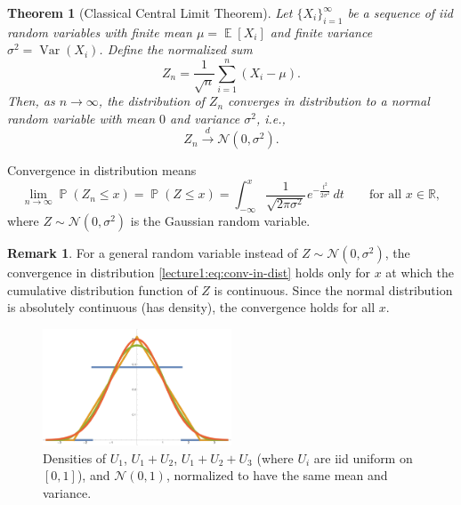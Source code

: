 \documentclass[letterpaper,11pt,oneside,reqno]{book}
\numberwithin{equation}{chapter}  %
\newcommand{\ssp}{\hspace{1pt}}
\newtheorem{theorem}[proposition]{Theorem}
\theoremstyle{definition}
\newtheorem{remark}[proposition]{Remark}
\begin{document}
\begin{theorem}[Classical Central Limit Theorem]
	Let $\{X_i\}_{i=1}^{\infty}$ be a sequence of iid random variables with finite mean $\mu = \operatorname{\mathbb{E}}[X_i]$ and finite
	variance $\sigma^2 = \operatorname{\mathrm{Var}}(X_i)$.
	Define the normalized sum
\begin{equation}
	\label{lecture1:eq:normalized-sum}
	Z_n = \frac{1}{\sqrt{n}} \sum_{i=1}^n \left(X_i - \mu\right).
\end{equation}
Then, as $n \to \infty$, the distribution of $Z_n$ converges in distribution to a normal random variable with mean $0$ and variance $\sigma^2$, i.e.,
\[
Z_n \xrightarrow{d} \mathcal{N}(0, \sigma^2).
\]
\end{theorem}
Convergence in distribution means
\begin{equation}
	\label{lecture1:eq:conv-in-dist}
	\lim_{n \to \infty} \operatorname{\mathbb{P}}(Z_n \leq x) = \operatorname{\mathbb{P}}(Z \leq x)
		= \int_{-\infty}^x \frac{1}{\sqrt{2\pi \sigma^2}}\ssp e^{-\frac{t^2}{2\sigma^2}} \, dt
	\qquad
	\text{for all } x \in \mathbb{R},
\end{equation}
where $Z \sim \mathcal{N}(0, \sigma^2)$ is the Gaussian random variable.

\begin{remark}
	For a general random variable instead of
	$Z\sim \mathcal{N}(0, \sigma^2)$, the convergence in distribution
	\eqref{lecture1:eq:conv-in-dist} holds only for $x$ at which the cumulative distribution function of $Z$ is continuous.
	Since the normal distribution is absolutely continuous (has density), the convergence holds for all $x$.
\end{remark}
\begin{figure}[htpb]
	\centering
	\includegraphics[width=0.5\textwidth]{./pictures/uniform_pdfs.pdf}
	\caption{Densities of $U_1$, $U_1+U_2$, $U_1+U_2+U_3$ (where $U_i$ are iid uniform on $[0,1]$),
		and $\mathcal{N}(0,1)$,
		normalized to have the same mean and variance.}
	\label{lecture1:fig:uniform_pdfs}
\end{figure}
\end{document}
